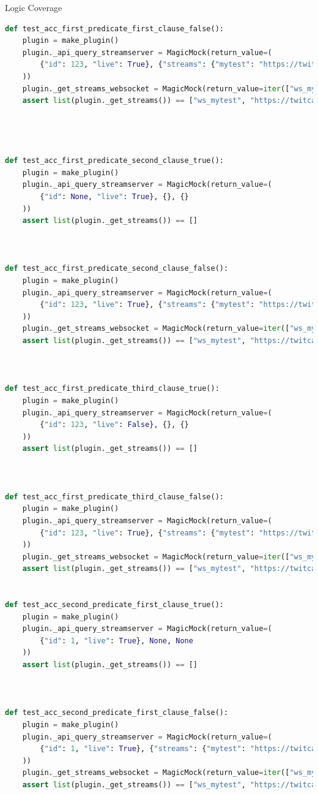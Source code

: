 \documentclass[a4paper]{scrreprt}
\newcounter{question}
\begin{document}
\begin{question}{Logic Coverage}
\begin{enumerate}[topsep=0pt, leftmargin=*]
\begin{answer}
\begin{lstlisting}[language=Python]
def test_acc_first_predicate_first_clause_false():
    plugin = make_plugin()
    plugin._api_query_streamserver = MagicMock(return_value=(
        {"id": 123, "live": True}, {"streams": {"mytest": "https://twitcasting.tv/testuser"}}, None
    ))
    plugin._get_streams_websocket = MagicMock(return_value=iter(["ws_mytest", "https://twitcasting.tv/testuser"]))
    assert list(plugin._get_streams()) == ["ws_mytest", "https://twitcasting.tv/testuser"]




def test_acc_first_predicate_second_clause_true():
    plugin = make_plugin()
    plugin._api_query_streamserver = MagicMock(return_value=(
        {"id": None, "live": True}, {}, {}
    ))
    assert list(plugin._get_streams()) == []



def test_acc_first_predicate_second_clause_false():
    plugin = make_plugin()
    plugin._api_query_streamserver = MagicMock(return_value=(
        {"id": 123, "live": True}, {"streams": {"mytest": "https://twitcasting.tv/testuser"}}, None
    ))
    plugin._get_streams_websocket = MagicMock(return_value=iter(["ws_mytest", "https://twitcasting.tv/testuser"]))
    assert list(plugin._get_streams()) == ["ws_mytest", "https://twitcasting.tv/testuser"]



def test_acc_first_predicate_third_clause_true():
    plugin = make_plugin()
    plugin._api_query_streamserver = MagicMock(return_value=(
        {"id": 123, "live": False}, {}, {}
    ))
    assert list(plugin._get_streams()) == []



def test_acc_first_predicate_third_clause_false():
    plugin = make_plugin()
    plugin._api_query_streamserver = MagicMock(return_value=(
        {"id": 123, "live": True}, {"streams": {"mytest": "https://twitcasting.tv/testuser"}}, None
    ))
    plugin._get_streams_websocket = MagicMock(return_value=iter(["ws_mytest", "https://twitcasting.tv/testuser"]))
    assert list(plugin._get_streams()) == ["ws_mytest", "https://twitcasting.tv/testuser"]


def test_acc_second_predicate_first_clause_true():
    plugin = make_plugin()
    plugin._api_query_streamserver = MagicMock(return_value=(
        {"id": 1, "live": True}, None, None
    ))
    assert list(plugin._get_streams()) == []



def test_acc_second_predicate_first_clause_false():
    plugin = make_plugin()
    plugin._api_query_streamserver = MagicMock(return_value=(
        {"id": 1, "live": True}, {"streams": {"mytest": "https://twitcasting.tv/testuser"}}, None
    ))
    plugin._get_streams_websocket = MagicMock(return_value=iter(["ws_mytest", "https://twitcasting.tv/testuser"]))
    assert list(plugin._get_streams()) == ["ws_mytest", "https://twitcasting.tv/testuser"]





\end{lstlisting}
\end{answer}
\end{enumerate}
\end{question}
\end{document}
